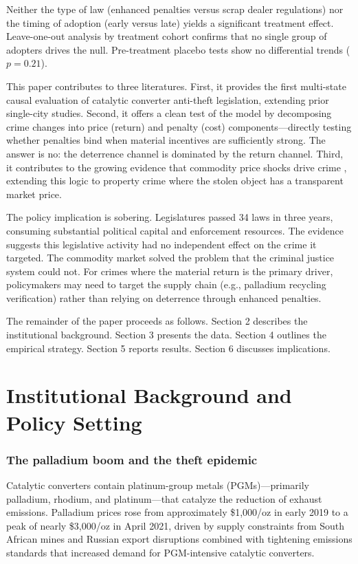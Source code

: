 \documentclass[12pt]{article}
\begin{document}
Neither the type of law (enhanced penalties versus scrap dealer regulations) nor the timing of adoption (early versus late) yields a significant treatment effect. Leave-one-out analysis by treatment cohort confirms that no single group of adopters drives the null. Pre-treatment placebo tests show no differential trends ($p = 0.21$).

This paper contributes to three literatures. First, it provides the first multi-state causal evaluation of catalytic converter anti-theft legislation, extending prior single-city studies. Second, it offers a clean test of the \citet{becker1968crime} model by decomposing crime changes into price (return) and penalty (cost) components---directly testing whether penalties bind when material incentives are sufficiently strong. The answer is no: the deterrence channel is dominated by the return channel. Third, it contributes to the growing evidence that commodity price shocks drive crime \citep{dube2013cross, draca2019changing}, extending this logic to property crime where the stolen object has a transparent market price.

The policy implication is sobering. Legislatures passed 34 laws in three years, consuming substantial political capital and enforcement resources. The evidence suggests this legislative activity had no independent effect on the crime it targeted. The commodity market solved the problem that the criminal justice system could not. For crimes where the material return is the primary driver, policymakers may need to target the supply chain (e.g., palladium recycling verification) rather than relying on deterrence through enhanced penalties.

The remainder of the paper proceeds as follows. Section 2 describes the institutional background. Section 3 presents the data. Section 4 outlines the empirical strategy. Section 5 reports results. Section 6 discusses implications.

\section{Institutional Background and Policy Setting}

\subsubsection*{The palladium boom and the theft epidemic} Catalytic converters contain platinum-group metals (PGMs)---primarily palladium, rhodium, and platinum---that catalyze the reduction of exhaust emissions. Palladium prices rose from approximately \$1,000/oz in early 2019 to a peak of nearly \$3,000/oz in April 2021, driven by supply constraints from South African mines and Russian export disruptions combined with tightening emissions standards that increased demand for PGM-intensive catalytic converters.
\end{document}
